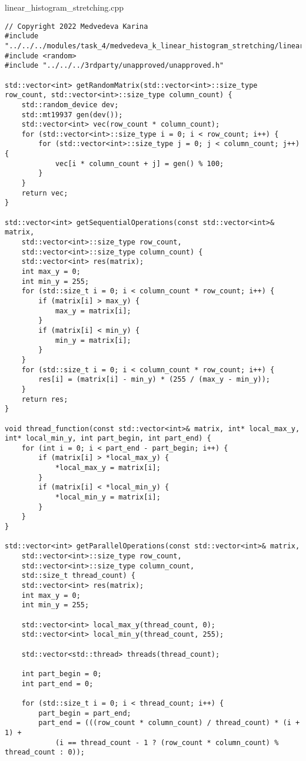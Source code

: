 \documentclass{report}
\begin{document}
\par linear\_histogram\_stretching.cpp
\begin{lstlisting}
// Copyright 2022 Medvedeva Karina
#include "../../../modules/task_4/medvedeva_k_linear_histogram_stretching/linear_histogram_stretching.h"
#include <random>
#include "../../../3rdparty/unapproved/unapproved.h"

std::vector<int> getRandomMatrix(std::vector<int>::size_type row_count, std::vector<int>::size_type column_count) {
    std::random_device dev;
    std::mt19937 gen(dev());
    std::vector<int> vec(row_count * column_count);
    for (std::vector<int>::size_type i = 0; i < row_count; i++) {
        for (std::vector<int>::size_type j = 0; j < column_count; j++) {
            vec[i * column_count + j] = gen() % 100;
        }
    }
    return vec;
}

std::vector<int> getSequentialOperations(const std::vector<int>& matrix,
    std::vector<int>::size_type row_count,
    std::vector<int>::size_type column_count) {
    std::vector<int> res(matrix);
    int max_y = 0;
    int min_y = 255;
    for (std::size_t i = 0; i < column_count * row_count; i++) {
        if (matrix[i] > max_y) {
            max_y = matrix[i];
        }
        if (matrix[i] < min_y) {
            min_y = matrix[i];
        }
    }
    for (std::size_t i = 0; i < column_count * row_count; i++) {
        res[i] = (matrix[i] - min_y) * (255 / (max_y - min_y));
    }
    return res;
}

void thread_function(const std::vector<int>& matrix, int* local_max_y, int* local_min_y, int part_begin, int part_end) {
    for (int i = 0; i < part_end - part_begin; i++) {
        if (matrix[i] > *local_max_y) {
            *local_max_y = matrix[i];
        }
        if (matrix[i] < *local_min_y) {
            *local_min_y = matrix[i];
        }
    }
}

std::vector<int> getParallelOperations(const std::vector<int>& matrix,
    std::vector<int>::size_type row_count,
    std::vector<int>::size_type column_count,
    std::size_t thread_count) {
    std::vector<int> res(matrix);
    int max_y = 0;
    int min_y = 255;

    std::vector<int> local_max_y(thread_count, 0);
    std::vector<int> local_min_y(thread_count, 255);

    std::vector<std::thread> threads(thread_count);

    int part_begin = 0;
    int part_end = 0;

    for (std::size_t i = 0; i < thread_count; i++) {
        part_begin = part_end;
        part_end = (((row_count * column_count) / thread_count) * (i + 1) +
            (i == thread_count - 1 ? (row_count * column_count) % thread_count : 0));


\end{lstlisting}
\end{document}
